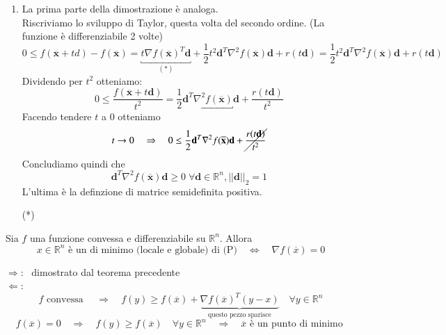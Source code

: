 \begin{thproof}
\begin{enumerate}
\item La prima parte della dimostrazione è analoga. \\ Riscriviamo lo
sviluppo di Taylor, questa volta del secondo ordine. (La funzione è
differenziabile 2 volte)
 $$ 0 \leq f(\overline{\mathbf{x}} + td) - f(\overline{\mathbf{x}}) =
 \underbracket{t \nabla f(\overline{\mathbf{x}})^{T} \mathbf{d}}_{(*)}
+ \frac{1}{2} t^{2} \mathbf{d}^{T} \nabla^{2} f(\overline{\mathbf{x}})
\mathbf{d} + r(t\mathbf{d}) = \frac{1}{2} t^{2} \mathbf{d}^{T}
\nabla^{2} f(\overline{\mathbf{x}}) \mathbf{d} + r(t\mathbf{d})
$$
Dividendo per $t^2$ otteniamo:
 $$ 0 \leq \frac{f(\overline{\mathbf{x}} + t\mathbf{d})}{t^2} = 
\frac{1}{2} \underbracket{\mathbf{d}^{T}\nabla^{2} f(\overline{\mathbf{x}})} \mathbf{d}
 + \frac{r(t\mathbf{d})}{t^2} 
$$
Facendo tendere $t$ a 0 otteniamo
$$
{t \rightarrow 0 \quad \Rightarrow \quad 0 \leq \frac{1}{2}
\mathbf{d}^{T} \nabla^{2}f(\overline{\mathbf{x}})\mathbf{d}} +
\cancel{\frac{r(t\mathbf{d})}{t^2}}
$$
Concludiamo quindi che
 $$ \mathbf{d}^{T} \nabla^{2} f(\overline{\mathbf{x}})\mathbf{d}
 \geq 0 \; \forall \mathbf{d}  \in \mathbb{R}^{n}, ||\mathbf{d}||_{2} = 1
$$
L'ultima è la definzione di matrice semidefinita positiva.
 \end{enumerate}
\begin{notes} 
\begin{itemize}
\item[(*)] 
\end{itemize}
\end{notes}


\end{thproof}
\begin{theo} Sia $f$ una funzione convessa e
differenziabile su $\mathbb{R}^{n}$. Allora
$$ x \in \mathbb{R}^{n}
\text{ \`e un di minimo (locale e globale) di (P)} \quad \Longleftrightarrow \quad
\nabla f(\overline{x}) = 0
$$
\end{theo}
\begin{thproof} $\Rightarrow$: \ dimostrato dal teorema precedente \\
$\Leftarrow$:
 $$ f \text{ convessa }  \quad \Longrightarrow \quad  f(y) \geq f(\overline{x}) +
 \underbrace{\nabla f(\overline{x})^{T}(y-x)}_{\text{questo pezzo sparisce}} \quad
 \forall y \in \mathbb{R}^{n} 
$$
$$ f(\overline{x}) = 0  
\quad \Longrightarrow \quad f(y) \geq f(\overline{x}) \quad \forall y
\in \mathbb{R}^{n} \quad \Longrightarrow \quad \overline{x}
 \text{ \`e un punto di minimo }
 $$
\end{thproof}

